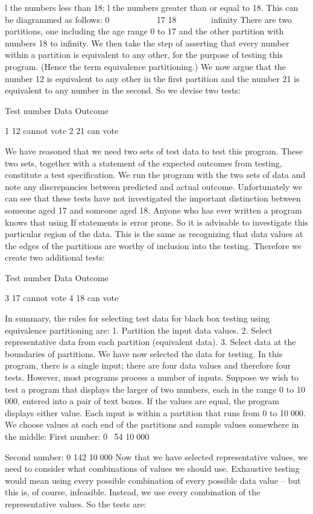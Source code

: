 l	the numbers less than 18;
l	the numbers greater than or equal to 18.
This can be diagrammed as follows:
0           	17	18        	inﬁnity
There are two partitions, one including the age range 0 to 17 and the other partition with numbers 18 to inﬁnity. We then take the step of asserting that every number within a partition is equivalent to any other, for the purpose of testing this program. (Hence the term equivalence partitioning.) We now argue that the number 12 is 
equivalent to any other in the ﬁrst partition and the number 21 is equivalent to any
number in the second. So we devise two tests:
 
Test number	Data	Outcome

1	12	cannot vote
2	21	can vote

We have reasoned that we need two sets of test data to test this program. These two sets, together with a statement of the expected outcomes from testing, constitute a test speciﬁcation. We run the program with the two sets of data and note any discrepancies between predicted and actual outcome.
Unfortunately we can see that these tests have not investigated the important 
distinction between someone aged 17 and someone aged 18. Anyone who has ever written a program knows that using If statements is error prone. So it is advisable to investigate this particular region of the data. This is the same as recognizing that data values at the edges of the partitions are worthy of inclusion into the testing. Therefore we create two additional tests:

Test number	Data	Outcome

3	17	cannot vote
4	18	can vote

In summary, the rules for selecting test data for black box testing using equivalence partitioning are:
1.	Partition the input data values.
2.	Select representative data from each partition (equivalent data).
3.	Select data at the boundaries of partitions.
We have now selected the data for testing. In this program, there is a single input; there are four data values and therefore four tests. However, most programs process a number of inputs. Suppose we wish to test a program that displays the larger of two numbers, each in the range 0 to 10 000, entered into a pair of text boxes. If the values are equal, the program displays either value.
Each input is within a partition that runs from 0 to 10 000. We choose values at each end of the partitions and sample values somewhere in the middle:
First number:	0	 54	10 000

Second number:	0	142	10 000
Now that we have selected representative values, we need to consider what combinations of values we should use. Exhaustive testing would mean using every possible combination of every possible data value – but this is, of course, infeasible. Instead, we use every combination of the representative values. So the tests are:

